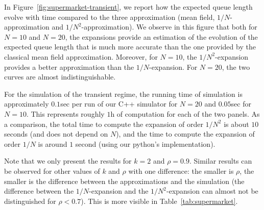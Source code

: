 \documentclass[sigconf]{acmart}
\begin{document}
In Figure~\ref{fig:supermarket-transient}, we report how the expected
queue length evolve with time compared to the three approximation
(mean field, $1/N$-approximation and $1/N^2$-approximation).  We
observe in this figure that both for $N=10$ and $N=20$, the expansions
provide an estimation of the evolution of the expected queue length
that is much more accurate than the one provided by the classical mean
field approximation. Moreover, for $N=10$, the $1/N^2$-expansion
provides a better approximation than the $1/N$-expansion. For $N=20$,
the two curves are almost indistinguishable.

For the simulation of the transient regime, the running time of
simulation is approximately $0.1$sec per run of our C++ simulator for
$N=20$ and $0.05$sec for $N=10$. This represents roughly $1$h of
computation for each of the two panels. As a comparison, the total
time to compute the expansion of order $1/N^2$ is about $10$ seconds
(and does not depend on $N$), and the time to compute the expansion of
order $1/N$ is around $1$ second (using our python's implementation). 



Note that we only present the results for $k=2$ and
$\rho=0.9$. Similar results can be observed for other values of $k$
and $\rho$ with one difference: the smaller is $\rho$, the smaller is
the difference between the approximations and the simulation (the
difference between the $1/N$-expansion and the $1/N^2$-expansion can
almost not be distinguished for $\rho<0.7$). This is more visible in
Table~\ref{tab:supermarket}.
\end{document}
